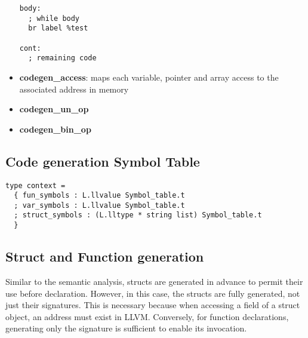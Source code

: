 \documentclass{article}
\begin{document}
\begin{itemize}
\begin{minipage}{0.45\textwidth}
\begin{verbatim}
body:
  ; while body
  br label %test

cont:
  ; remaining code

\end{verbatim}
\end{minipage}





  \item \textbf{codegen\_access}: maps each variable, pointer and array access to the associated address in memory
  \item \textbf{codegen\_un\_op}
  \item \textbf{codegen\_bin\_op}
\end{itemize}

\subsection*{Code generation Symbol Table}
\begin{lstlisting}
type context =
  { fun_symbols : L.llvalue Symbol_table.t
  ; var_symbols : L.llvalue Symbol_table.t
  ; struct_symbols : (L.lltype * string list) Symbol_table.t
  }
\end{lstlisting}

\subsection*{Struct and Function generation}
Similar to the semantic analysis, structs are generated in advance to
permit their use before declaration. However, in this case, the structs
are fully generated, not just their signatures.
This is necessary because when accessing a field of a struct object,
an address must exist in LLVM. Conversely, for function declarations,
generating only the signature is sufficient to enable its invocation.
\end{document}
